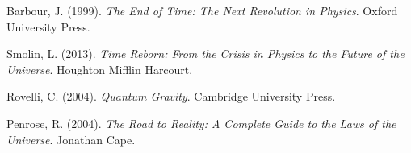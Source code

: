 \documentclass[12pt,a4paper]{article}
\begin{document}
\begin{thebibliography}{99}
Barbour, J. (1999). \textit{The End of Time: The Next Revolution in Physics}. Oxford University Press.

Smolin, L. (2013). \textit{Time Reborn: From the Crisis in Physics to the Future of the Universe}. Houghton Mifflin Harcourt.

Rovelli, C. (2004). \textit{Quantum Gravity}. Cambridge University Press.

Penrose, R. (2004). \textit{The Road to Reality: A Complete Guide to the Laws of the Universe}. Jonathan Cape.

\end{thebibliography}
\end{document}
